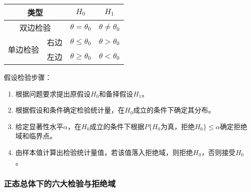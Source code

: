 \documentclass[UTF8, 12pt]{ctexart}
\begin{document}
\begin{tabular}{|c|c|c|c|}
    \hline
    \multicolumn{2}{|c|}{类型} & $H_0$ & $H_1$ \\ \hline
    \multicolumn{2}{|c|}{双边检验} & $\theta=\theta_0$ & $\theta\neq\theta_0$ \\ \hline
    \multirow{2}{*}{单边检验} & 右边 & $\theta\leqslant\theta_0$ & $\theta>\theta_0$ \\ \cline{2-4}
    & 左边 & $\theta\geqslant\theta_0$ & $\theta<\theta_0$ \\ \hline
\end{tabular} \medskip

假设检验步骤：

\begin{enumerate}
    \item 根据问题要求提出原假设$H_0$和备择假设$H_1$。
    \item 根据假设和条件确定检验统计量，在$H_0$成立的条件下确定其分布。
    \item 给定显著性水平$\alpha$，在$H_0$成立的条件下根据$P\{H_0\text{为真，拒绝}H_0\}\leqslant\alpha$确定拒绝域和临界点。
    \item 由样本值计算出检验统计量值，若该值落入拒绝域，则拒绝$H_0$，否则接受$H_0$。
\end{enumerate}

\subsubsection{正态总体下的六大检验与拒绝域}
\end{document}
